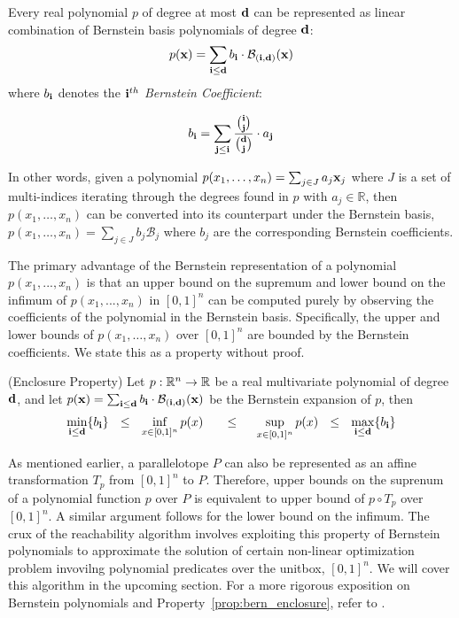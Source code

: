 \begin{property}
\label{prop:bern_basis}
Every real polynomial $p$ of degree at most ${\bf d}$ can be represented as linear combination of Bernstein basis polynomials of degree ${\bf d}$:
%
\begin{equation}
  \label{eq:bernstein_coeff}
  p({\bf x}) = \sum_{{\bf i} \leq {\bf d}} b_{{\bf i}} \cdot \mathcal{B}_{({\bf i},{\bf d})}({\bf x})
\end{equation}
where $b_{\bf i}$ denotes the \emph{${\bf i}^{th}$ Bernstein Coefficient}:

\begin{equation}
b_{{\bf i}} = \sum_{{\bf j} \leq {\bf i}} \frac{\binom{{\bf i}}{{\bf j}}}{\binom{{\bf d}}{{\bf j}}}\cdot a_{{\bf j}}
\end{equation}
\end{property}

\noindent In other words, given a polynomial $p(x_1,\ldots,x_n) = \sum_{j \in J} a_j {\bf x}_{j}$ where $J$ is a set of multi-indices iterating through the degrees found in $p$ with $a_j \in \mathbb{R}$, then $p(x_1,\ldots,x_n)$ can be converted into its counterpart under the Bernstein basis, $p(x_1,\ldots,x_n) = \sum_{j \in J} b_j \mathcal{B}_j $ where $b_j$ are the corresponding Bernstein coefficients.

The primary advantage of the Bernstein representation of a polynomial $p(x_1,...,x_n)$ is that an upper bound on the supremum and lower bound on the infimum of $p(x_1,...,x_n)$ in $[0,1]^{n}$ can be computed purely by observing the coefficients of the polynomial in the Bernstein basis. Specifically, the upper and lower bounds of $p(x_1,\ldots,x_n)$ over $[0,1]^n$ are bounded by the Bernstein coefficients. We state this as a property without proof.

\begin{property} (Enclosure Property)
  \label{prop:bern_enclosure}
  Let $p: {\mathbb{R}}^n \rightarrow {\mathbb{R}}$ be a real multivariate polynomial of degree ${\bf d}$, and let $p({\bf x}) = \sum_{{\bf i} \leq {\bf d}} b_{\bf i} \cdot \mathcal{B}_{({\bf i},{\bf d})}({\bf x})$ be the Bernstein expansion of $p$, then
  $$
  \min_{{\bf i} \leq {\bf d}} \{b_{\bf i}\} ~~\leq~~ \inf_{x \in [0,1]^n} p(x) ~~~~~\leq~~~~ \sup_{x \in [0,1]^{n}} p(x) ~~\leq~~ \max_{{\bf i} \leq {\bf d}} \{b_{\bf i}\}
  $$
\end{property}


As mentioned earlier, a parallelotope $P$ can also be represented as an affine transformation $T_{p}$ from $[0,1]^{n}$ to $P$.
%
Therefore, upper bounds on the suprenum of a polynomial function $p$ over $P$ is equivalent to upper bound of $p \circ T_{p}$ over $[0,1]^{n}$.
%
A similar argument follows for the lower bound on the infimum.
%
The crux of the reachability algorithm involves exploiting this property of Bernstein polynomials to approximate the solution of certain non-linear optimization problem invovilng polynomial predicates over the unitbox, $[0,1]^n$.
%
We will cover this algorithm in the upcoming section.
%
For a more rigorous exposition on Bernstein polynomials and Property~\ref{prop:bern_enclosure}, refer to \cite{garloff2003bernstein}.


